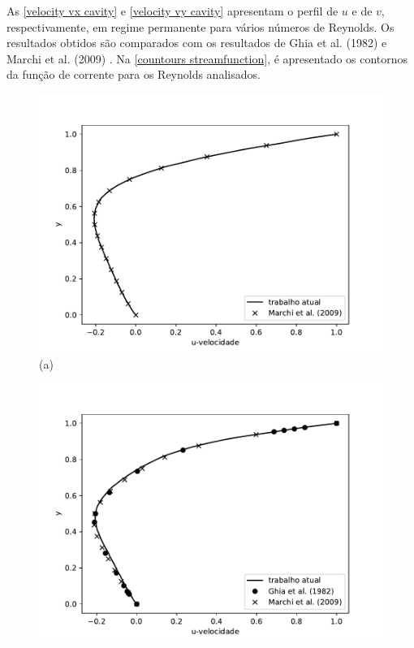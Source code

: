 \newpage
As \ref{velocity vx cavity} e \ref{velocity vy cavity} apresentam 
o perfil de $u$ e de $v$, respectivamente, em regime permanente para vários números de Reynolds.
Os resultados obtidos são comparados com os resultados de Ghia et al. (1982) \cite{ghia1982} e Marchi et al. (2009)  \cite{marchi2009}.
Na \ref{countours streamfunction}, é apresentado os contornos da função de corrente para os Reynolds analisados.

\begin{center}
\begin{figure}[H]
     \centering
     \begin{minipage}{.5\linewidth}
      \centering
      \includegraphics[scale=0.53]{./02_chaps/cap_validation/figure/Re_10_u_profile.pdf}\\
      (a)
     \end{minipage}%
     \begin{minipage}{.5\linewidth}
      \centering
      \includegraphics[scale=0.53]{./02_chaps/cap_validation/figure/Re_100_u_profile.pdf}\\

\end{minipage}
\end{figure}
\end{center}
